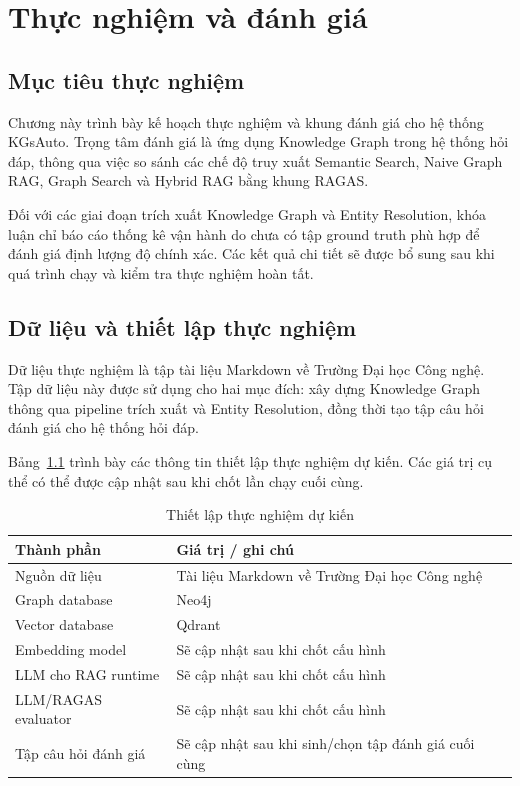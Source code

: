 \chapter{Thực nghiệm và đánh giá}

\section{Mục tiêu thực nghiệm}

Chương này trình bày kế hoạch thực nghiệm và khung đánh giá cho hệ thống KGsAuto. Trọng tâm đánh giá là ứng dụng Knowledge Graph trong hệ thống hỏi đáp, thông qua việc so sánh các chế độ truy xuất Semantic Search, Naive Graph RAG, Graph Search và Hybrid RAG bằng khung RAGAS.

Đối với các giai đoạn trích xuất Knowledge Graph và Entity Resolution, khóa luận chỉ báo cáo thống kê vận hành do chưa có tập ground truth phù hợp để đánh giá định lượng độ chính xác. Các kết quả chi tiết sẽ được bổ sung sau khi quá trình chạy và kiểm tra thực nghiệm hoàn tất.

\section{Dữ liệu và thiết lập thực nghiệm}

Dữ liệu thực nghiệm là tập tài liệu Markdown về Trường Đại học Công nghệ. Tập dữ liệu này được sử dụng cho hai mục đích: xây dựng Knowledge Graph thông qua pipeline trích xuất và Entity Resolution, đồng thời tạo tập câu hỏi đánh giá cho hệ thống hỏi đáp.

Bảng~\ref{tab:experiment_setup_placeholder} trình bày các thông tin thiết lập thực nghiệm dự kiến. Các giá trị cụ thể có thể được cập nhật sau khi chốt lần chạy cuối cùng.

\begin{table}[H]
\centering
\caption{Thiết lập thực nghiệm dự kiến}
\label{tab:experiment_setup_placeholder}
\begin{tabularx}{\textwidth}{|p{}|X|}
\hline
\textbf{Thành phần} & \textbf{Giá trị / ghi chú} \\
\hline
Nguồn dữ liệu & Tài liệu Markdown về Trường Đại học Công nghệ \\
\hline
Graph database & Neo4j \\
\hline
Vector database & Qdrant \\
\hline
Embedding model & Sẽ cập nhật sau khi chốt cấu hình \\
\hline
LLM cho RAG runtime & Sẽ cập nhật sau khi chốt cấu hình \\
\hline
LLM/RAGAS evaluator & Sẽ cập nhật sau khi chốt cấu hình \\
\hline
Tập câu hỏi đánh giá & Sẽ cập nhật sau khi sinh/chọn tập đánh giá cuối cùng \\
\hline
\end{tabularx}
\end{table}

